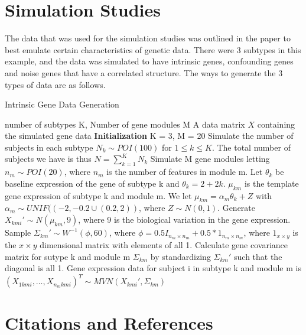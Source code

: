 \documentclass{statsoc}
\begin{document}
\section{Simulation Studies}

The data that was used for the simulation studies was outlined in the paper to best emulate certain characteristics of genetic data. There were 3 subtypes in this example, and the data was simulated to have intrinsic genes, confounding genes and noise genes that have a correlated structure. The ways to generate the 3 types of data are as follows. 

\begin{algorithm}
    \caption{Intrinsic Gene Data Generation}
    \begin{algorithmic}[1]
        \INPUT number of subtypes K, Number of gene modules M
        \OUTPUT A data matrix $X$ containing the simulated gene data
        \STATE \textbf{Initialization} K = 3, M = 20
        \STATE Simulate the number of subjects in each subtype $N_k \sim POI(100)$ for $1 \leq k \leq K$. The total number of subjects we have is thus $N = \sum_{k=1}^K N_k$
        \STATE Simulate M gene modules letting $n_m \sim POI(20)$, where $n_m$ is the number of features in module m.
        \STATE Let $\theta_k$ be baseline expression of the gene of subtype k and $\theta_k = 2 + 2k$. $\mu_{km}$ is the template gene expression of subtype k and module m. We let $\mu_{km} = \alpha_m\theta_k + Z$ with $\alpha_m \sim UNIF((-2,-0.2 \cup (0.2,2))$, where $Z \sim N(0,1)$.
        \STATE Generate $X_{kmi}' \sim N(\mu_{km}, 9)$, where 9 is the biological variation in the gene expression. 
        \STATE Sample $\Sigma_{km}' \sim W^{-1}(\phi, 60)$, where $\phi = 0.5 I_{n_m \times n_m} + 0.5*1_{n_m\times n_m}$, where $1_{x\times y}$ is the $x\times y$ dimensional matrix with elements of all 1.
        \STATE Calculate gene covariance matrix for sutype k and module m $\Sigma_{km}$ by standardizing $\Sigma_{km}'$ such that the diagonal is all 1.
        \STATE Gene expression data for subject i in subtype k and module m is $(X_{1kmi}, \ldots, X_{n_mkmi})^T \sim MVN(X_{kmi}', \Sigma_{km})$
    \end{algorithmic}
\end{algorithm}

\section{Citations and References}
\end{document}
